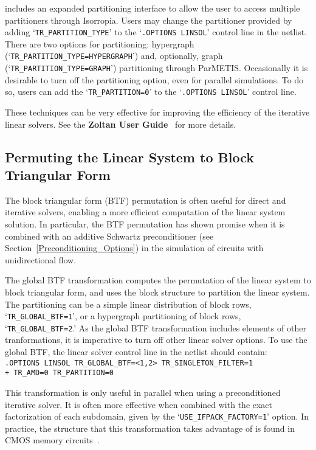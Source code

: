 \Xyce{} includes an expanded partitioning interface to allow the user to access multiple partitioners through Isorropia. 
Users may change the partitioner provided by adding `\texttt{TR\_PARTITION\_TYPE}' to the `\texttt{.OPTIONS LINSOL}' control line in
the netlist. There are two options for partitioning:  hypergraph
(`\texttt{TR\_PARTITION\_TYPE=HYPERGRAPH}') and, optionally, graph (`\texttt{TR\_PARTITION\_TYPE=GRAPH}') partitioning through ParMETIS.
Occasionally it is desirable to turn off the partitioning option, even for parallel simulations.   To do so, users can add the 
`\texttt{TR\_PARTITION=0}' to the `\texttt{.OPTIONS LINSOL}' control line.

These techniques can be very effective for improving the
efficiency of the iterative linear solvers.
See the \textbf{Zoltan User Guide}~\cite{zoltan:user} for more details.

\subsection{Permuting the Linear System to Block Triangular Form}
\label{BTF_Precond}
The block triangular form (BTF) permutation is often useful for direct and iterative
solvers, enabling a more efficient computation of the linear system solution.
In particular, the BTF permutation has shown promise when it is combined with
an additive Schwartz preconditioner (see Section~\ref{Preconditioning_Options}) in the simulation of
circuits with unidirectional flow.  

The global BTF transformation computes the permutation of the linear system to
block triangular form, and uses the block structure to partition the linear system. The partitioning can be
a simple linear distribution of block rows, `\texttt{TR\_GLOBAL\_BTF=1}', or a
hypergraph partitioning of block rows, `\texttt{TR\_GLOBAL\_BTF=2}.'
As the global BTF transformation includes elements of other tranformations,
it is imperative to turn off other linear solver options.  
To use the global BTF, the linear solver control line in the netlist should 
contain: \\[0.5em] 
\noindent \verb|.OPTIONS LINSOL TR_GLOBAL_BTF=<1,2> TR_SINGLETON_FILTER=1|\\
\noindent \verb|+ TR_AMD=0 TR_PARTITION=0|

This transformation is only useful in parallel when using a preconditioned iterative solver.
It is often more effective when combined with the exact factorization of each subdomain,
given by the `\texttt{USE\_IFPACK\_FACTORY=1}' option.  In practice, the structure
that this transformation takes advantage of is found in CMOS memory circuits~\cite{ICCAD09_precond}.


